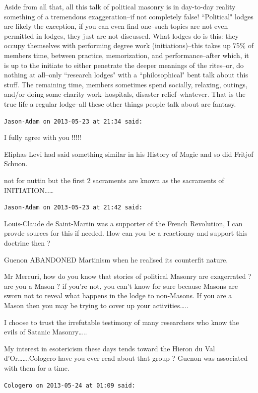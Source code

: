 \begin{footnotesize}
\begin{sffamily}
Aside from all that, all this talk of political masonry is in day-to-day reality something of a tremendous exaggeration–if not completely false! ``Political" lodges are likely the exception, if you can even find one–such topics are not even permitted in lodges, they just are not discussed. What lodges do is this: they occupy themselves with performing degree work (initiations)–this takes up 75\% of members time, between practice, memorization, and performance–after which, it is up to the initiate to either penetrate the deeper meanings of the rites–or, do nothing at all–only ``research lodges" with a ``philosophical" bent talk about this stuff. The remaining time, members sometimes spend socially, relaxing, outings, and/or doing some charity work–hospitals, disaster relief–whatever. That is the true life a regular lodge–all these other things people talk about are fantasy.


\hfill

\texttt{Jason-Adam on 2013-05-23 at 21:34 said: }

I fully agree with you !!!!!

Eliphas Levi had said something similar in his History of Magic and so did Fritjof Schuon. 

not for nuttin but the first 2 sacraments are known as the sacraments of INITIATION……


\hfill

\texttt{Jason-Adam on 2013-05-23 at 21:42 said: }

Louis-Claude de Saint-Martin was a supporter of the French Revolution, I can provde sources for this if needed. How can you be a reactionay and support this doctrine then ?

Guenon ABANDONED Martinism when he realised its counterfit nature.

Mr Mercuri, how do you know that stories of political Masonry are exagerrated ? are you a Mason ? if you're not, you can't know for sure because Masons are sworn not to reveal what happens in the lodge to non-Masons. If you are a Mason then you may be trying to cover up your activities…..

I choose to trust the irrefutable testimony of many researchers who know the evils of Satanic Masonry…..

My interest in esotericism these days tends toward the Hieron du Val d'Or…….Cologero have you ever read about that group ? Guenon was associated with them for a time.


\hfill

\texttt{Cologero on 2013-05-24 at 01:09 said: }


\end{sffamily}
\end{footnotesize}
